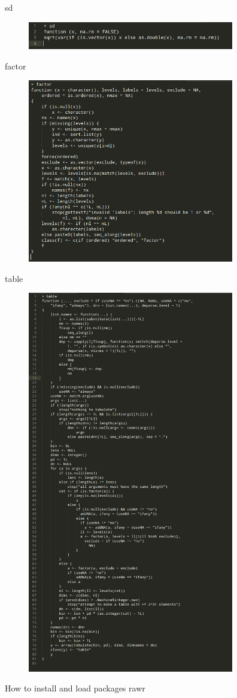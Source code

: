 \documentclass{beamer}\usepackage[]{graphicx}\usepackage[]{color}
\begin{document}
\begin{frame}[fragile]{sd}
\begin{figure}[ht!]
\centering
\includegraphics[width=90mm]{pictures/sd.jpg}
\label{overflow}
\end{figure}
\end{frame}


\begin{frame}[fragile]{factor}
\begin{figure}[ht!]
\centering
\includegraphics[width=90mm]{pictures/factor.jpg}
\label{overflow}
\end{figure}
\end{frame}


\begin{frame}[fragile]{table}
\begin{figure}[ht!]
\centering
\includegraphics[width=90mm]{pictures/table.jpg}
\label{overflow}
\end{figure}
\end{frame}


\begin{frame}[fragile]{How to install and load packages}
rawr
\end{frame}
\end{document}
